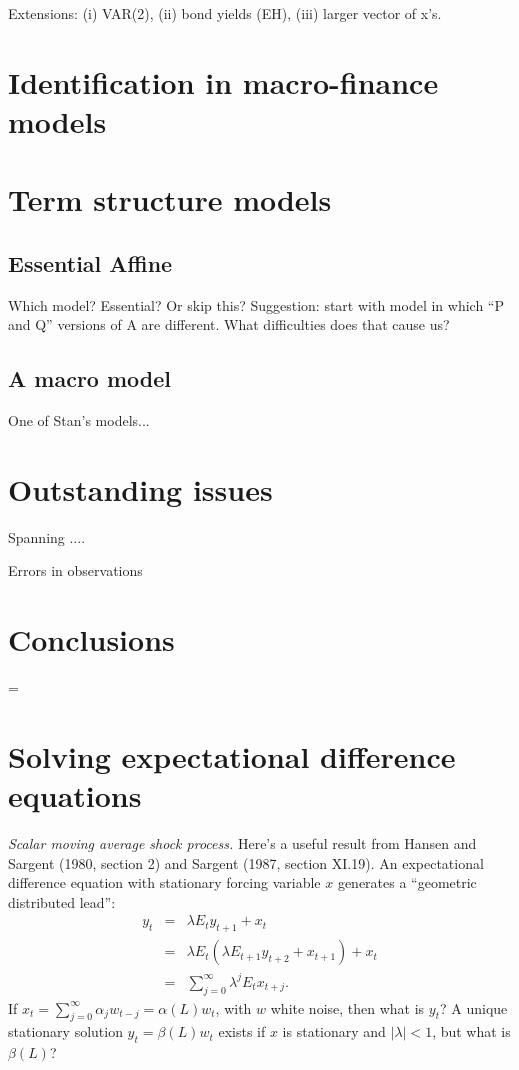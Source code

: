 \documentclass[11pt]{article}
\begin{document}
{Extensions:
(i) VAR(2), (ii) bond yields (EH), (iii) larger vector of x's.



\section{Identification in macro-finance models}



\section{Term structure models}


\subsection{Essential Affine}

Which model?  Essential?  Or skip this?
Suggestion:  start with model in which ``P and Q'' versions of A are different.
What difficulties does that cause us?


\subsection{A macro model}

One of Stan's models...


\section{Outstanding issues}

Spanning ....

Errors in observations



\section{Conclusions}


\pagebreak
\baselineskip=\oldbaselineskip
\appendix
\section{Solving expectational difference equations}
\label{app:hs-formulas}

{\it Scalar moving average shock process.\/}
Here's a useful result from Hansen and Sargent (1980, section 2)
and Sargent (1987, section XI.19).
An expectational difference equation with stationary forcing
variable $x$ generates a
``geometric distributed lead'':
\begin{eqnarray*}
    y_t &=&    \lambda E_t y_{t+1} + x_t  \\
        &=&  \lambda E_t (\lambda  E_{t+1} y_{t+2} + x_{t+1}) +  x_t \\
        &=&  \sum_{j=0}^\infty \lambda^j  E_t x_{t+j} .
\end{eqnarray*}
If $ x_t = \sum_{j=0}^\infty \alpha_j w_{t-j} = \alpha(L) w_t $,
with $w$ white noise, then what is $y_t$?
A unique stationary solution $ y_t = \beta(L) w_t $
exists if $x$ is stationary and $ |\lambda|<1 $,
but what is $\beta(L)$?

}
\end{document}
